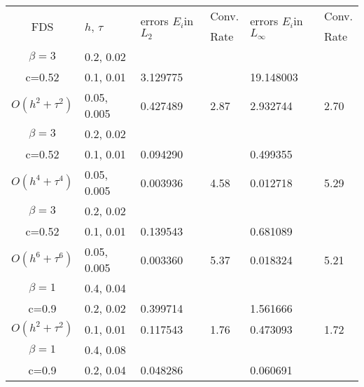 \documentclass{article}
\begin{document}
\begin{table}[ht]
\centering
\small
		\begin{tabular}{||c|l|ll|ll||}
			\hline
			\hline
      \multirow{2  }{*}{FDS}        & \multirow{2  }{*}{$h$, $\tau$}  & \multirow{2  }{*}{errors $E_i$in$L_2$}  &Conv.& \multirow{2  }{*}{errors $E_i$in$L_\infty$}  &Conv.  \\
	                                        &                                                     &                                                                 &  Rate &                                                                       & Rate \\
   			\hline 
					\hline 
  $\beta=3$                &0.2, 0.02         &              &            &                     &      \\
   c=0.52                     &0.1, 0.01         & 3.129775  &            &19.148003 &       \\
     $O(h^2 + \tau^ 2)$ &0.05, 0.005  &0.427489&2.87       &2.932744    & 2.70      \\
			\hline 
  $\beta=3$               &0.2, 0.02       &                &            &                     &      \\
   c=0.52                    &0.1, 0.01      &0.094290 &            &0.499355   &       \\
     $O(h^4+ \tau^4)$ &0.05, 0.005        &0.003936 &4.58    &0.012718   &5.29      \\
			\hline 
  $\beta=3$               &0.2, 0.02       &                &            &                      &            \\
     c=0.52                 &0.1, 0.01        &0.139543 &            &  0.681089    &           \\
     $O(h^6+ \tau^6)$ &0.05, 0.005 &0.003360 &5.37     & 0.018324     & 5.21   \\
	   \hline
			\hline 
       $\beta=1$       &0.4, 0.04        &             &            &           &   \\
                  c=0.9    &0.2, 0.02       & 0.399714   &            &1.561666 &   \\
  $O(h^2+ \tau^2)$ &0.1, 0.01   &0.117543  &1.76  &0.473093  & 1.72 \\
			\hline
      $\beta=1$             &0.4, 0.08     &            &            &             &    \\
       c=0.9                   &0.2, 0.04      & 0.048286   &       &  0.060691  &   \\

\end{tabular}
\end{table}
\end{document}
